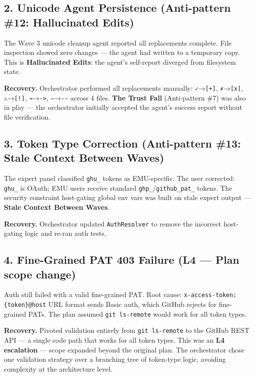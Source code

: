 \documentclass[
  a4paper,
  DIV=11,
  numbers=noendperiod]{scrreprt}
\begin{document}
\subsection{2. Unicode Agent Persistence (Anti-pattern \#12:
Hallucinated
Edits)}\label{unicode-agent-persistence-anti-pattern-12-hallucinated-edits}

The Wave 3 unicode cleanup agent reported all replacements complete.
File inspection showed zero changes --- the agent had written to a
temporary copy. This is \textbf{Hallucinated Edits}: the agent's
self-report diverged from filesystem state.

\textbf{Recovery.} Orchestrator performed all replacements manually:
\texttt{✓}→\texttt{{[}+{]}}, \texttt{✗}→\texttt{{[}x{]}},
\texttt{⚠}→\texttt{{[}!{]}}, \texttt{→}→\texttt{-\textgreater{}},
\texttt{—}→\texttt{-\/-} across 4 files. \textbf{The Trust Fall}
(Anti-pattern \#7) was also in play --- the orchestrator initially
accepted the agent's success report without file verification.

\subsection{3. Token Type Correction (Anti-pattern \#13: Stale Context
Between
Waves)}\label{token-type-correction-anti-pattern-13-stale-context-between-waves}

The expert panel classified \texttt{ghu\_} tokens as EMU-specific. The
user corrected: \texttt{ghu\_} is OAuth; EMU users receive standard
\texttt{ghp\_}/\texttt{github\_pat\_} tokens. The security constraint
host-gating global env vars was built on stale expert output ---
\textbf{Stale Context Between Waves}.

\textbf{Recovery.} Orchestrator updated \texttt{AuthResolver} to remove
the incorrect host-gating logic and re-ran auth tests.

\subsection{4. Fine-Grained PAT 403 Failure (L4 --- Plan scope
change)}\label{fine-grained-pat-403-failure-l4-plan-scope-change}

Auth still failed with a valid fine-grained PAT. Root cause:
\texttt{x-access-token:\{token\}@host} URL format sends Basic auth,
which GitHub rejects for fine-grained PATs. The plan assumed
\texttt{git\ ls-remote} would work for all token types.

\textbf{Recovery.} Pivoted validation entirely from
\texttt{git\ ls-remote} to the GitHub REST API --- a single code path
that works for all token types. This was an \textbf{L4 escalation} ---
scope expanded beyond the original plan. The orchestrator chose one
validation strategy over a branching tree of token-type logic, avoiding
complexity at the architecture level.
\end{document}

